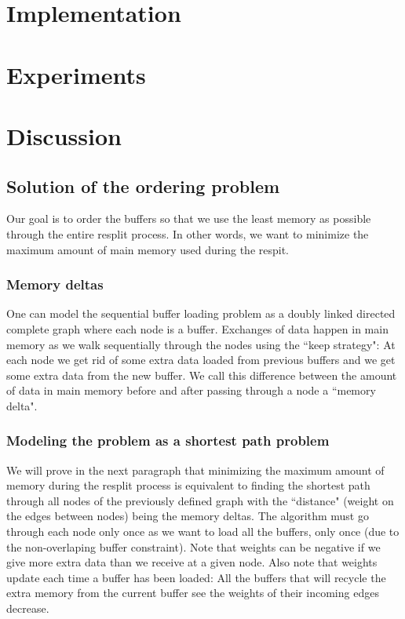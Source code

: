 \documentclass[conference]{IEEEtran}
\begin{document}
\section*{Implementation}

\section*{Experiments}

\section*{Discussion}

\subsection{Solution of the ordering problem}

Our goal is to order the buffers so that we use the least memory as possible through the entire resplit process.
In other words, we want to minimize the maximum amount of main memory used during the respit. \\

\subsubsection{Memory deltas}
One can model the sequential buffer loading problem as a doubly linked directed complete graph where each node is a buffer.
Exchanges of data happen in main memory as we walk sequentially through the nodes using the ``keep strategy":
At each node we get rid of some extra data loaded from previous buffers and we get some extra data from the new buffer.
We call this difference between the amount of data in main memory before and after passing through a node a ``memory delta". \\

\subsubsection{Modeling the problem as a shortest path problem}
We will prove in the next paragraph that minimizing the maximum amount of memory during the resplit process is equivalent to finding the shortest path through all nodes of the previously defined graph with the ``distance" (weight on the edges between nodes) being the memory deltas.
The algorithm must go through each node only once as we want to load all the buffers, only once (due to the non-overlaping buffer constraint).
Note that weights can be negative if we give more extra data than we receive at a given node.
Also note that weights update each time a buffer has been loaded:
All the buffers that will recycle the extra memory from the current buffer see the weights of their incoming edges decrease. \\
\end{document}
